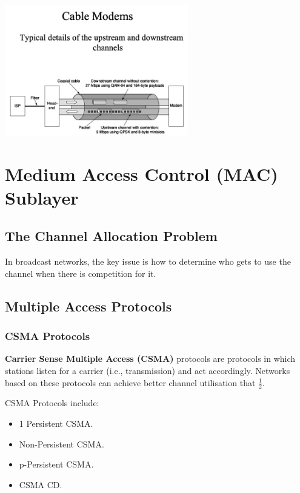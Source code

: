 \documentclass[11pt]{article}
\begin{document}
\begin{center}
    \includegraphics[width=0.6\textwidth]{cablemodems.png}
\end{center}

\section{Medium Access Control (MAC) Sublayer}
\subsection{The Channel Allocation Problem} 
In broadcast networks, the key issue is how to determine who gets to use the channel when there is competition for it.

\subsection{Multiple Access Protocols} 
\subsubsection{CSMA Protocols} 
\textbf{Carrier Sense Multiple Access (CSMA)} protocols are protocols in which stations listen for a carrier (i.e., transmission) 
and act accordingly. 
Networks based on these protocols can achieve better channel utilisation that $\frac{1}{2}$. 

CSMA Protocols include:
\begin{itemize}
    \item   1 Persistent CSMA. 
    \item   Non-Persistent CSMA. 
    \item   p-Persistent CSMA. 
    \item   CSMA CD. 
\end{itemize}
\end{document}
